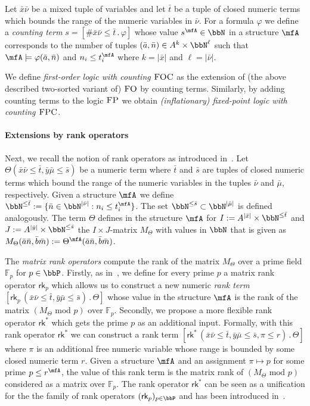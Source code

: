 \documentclass[a4paper,UKenglish]{lipics}
\newcommand{\defeq}{:=}
\newcommand{\card}[1]{\ensuremath{|#1|}}
\newcommand{\modulo}{\ensuremath{\text{mod }}}
\newcommand{\field}[1]{\mathbb{#1}}
\newcommand{\N}{\ensuremath{\bbN}}
\newcommand{\logic}[1]{\ensuremath{\textsc{#1}}\xspace}
\newcommand{\FO}{\logic{FO}}
\newcommand{\FOC}{\logic{FOC}}
\newcommand{\FP}{\logic{FP}}
\newcommand{\FPC}{\logic{FPC}}
\newcommand{\rkp}{\ensuremath{\textsf{rk}_p}\xspace}
\newcommand{\rk}{\ensuremath{\textsf{rk}^*}\xspace}
\renewcommand{\phi}{\varphi}
\newcommand{\ba}{{\bar a}}
\newcommand{\bb}{{\bar b}}
\newcommand{\bm}{{\bar m}}
\newcommand{\bn}{{\bar n}}
\newcommand{\bx}{{\bar x}}
\newcommand{\by}{{\bar y}}
\newcommand{\bmu}{{\bar \mu}}
\newcommand{\bnu}{{\bar \nu}}
\theoremstyle{plain}
\begin{document}
Let $\bx\bnu$ be a mixed tuple of variables and let $\bar t$ be a tuple of 
closed numeric terms which bounds the range of the numeric variables in $\bnu$.
For a formula $\phi$ we define a \emph{counting term} $s = [\# \bx\bnu \leq 
\bar t \,.\, \phi]$ whose value $s^\mfA \in \N$ in a structure $\mfA$ 
corresponds to the number of tuples 
$(\ba,\bar n) \in A^k \times \N^\ell$ such that $\mfA \models \phi(\ba, \bar 
n)$ 
and $n_i \leq t_i^\mfA$  where $k = \card \bx$ and $\ell = \card {\bnu }$.

We define \emph{first-order logic with counting $\FOC$} as the extension of 
(the above described two-sorted variant of) $\FO$ by counting terms. 
Similarly, by adding counting terms to the logic $\FP$ we obtain
\emph{(inflationary) fixed-point logic with counting $\FPC$}.


\paragraph*{Extensions by rank operators}

Next, we recall the notion of rank operators as introduced 
in~\cite{DaGrHoLa09}. 
Let $\Theta(\bx\bnu\leq \bar t ,\by\bmu \leq \bar s)$ be a numeric 
term where $\bar t$ and $\bar s$ are tuples of closed numeric terms which bound 
the 
range of the numeric variables in the tuples $\bnu$ and $\bmu$, respectively. 
Given a structure $\mfA$ we define $\N^{\leq \bar t} \defeq \{ \bn \in 
\N^{\card \bnu} : n_i \leq t_i^\mfA \}$. 
The set $\N^{\leq \bar s} \subset \N^{\card \bmu}$ is defined 
analogously. The term $\Theta$ defines in the structure $\mfA$ 
for $I \defeq A^{\card \bx} \times \N^{\leq \bar t}$ and $J \defeq A^{\card 
\by} \times \N^{\leq \bar s}$
the $I \times J$-matrix $M_\Theta$ with values in $\N$ that is given
as $M_\Theta(\ba\bn, \bb\bm) \defeq \Theta^\mfA(\ba\bn,\bb\bm)$.

The \emph{matrix rank operators} compute the rank of the matrix $M_\Theta$ 
over a prime field $\field F_p$ for $p \in \bbP$.
Firstly, as in~\cite{DaGrHoLa09}, we define for every prime $p$ a matrix rank 
operator $\rkp$ which allows us to construct a new numeric \emph{rank term} $[ 
\rkp 
\,(\bx\bnu\leq 
\bar t ,\by\bmu \leq \bar s) \, . \, \Theta ]$ whose value in the 
structure $\mfA$ is the rank of the matrix $(M_\Theta \,\,\modulo p)$ over 
$\field 
F_p$.
Secondly, we propose a more flexible rank operator $\rk$ which gets the prime 
$p$ as an additional input. Formally, with this rank operator $\rk$ we can 
construct a rank term $[ \rk \,(\bx\bnu\leq \bar t ,\by\bmu \leq \bar s,\pi 
\leq r) \, . \, \Theta ]$ where $\pi$ is an additional free numeric variable 
whose range is bounded by some closed numeric term $r$. Given a structure 
$\mfA$ 
and an assignment $\pi \mapsto p$ for some prime $p \leq r^\mfA$, the value of 
this rank term is the matrix rank of $(M_\Theta \,\,\modulo p)$ considered as a 
matrix over $\field F_p$.
The rank operator $\rk$ can be seen as a unification for the 
the family of rank operators $(\rkp)_{p \in \bbP}$ and has been introduced 
in~\cite{Ho10, La11, Pa10}.
\end{document}
